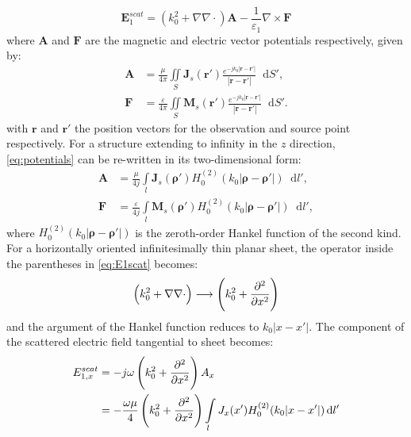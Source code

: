 \documentclass[11pt]{article}
\renewcommand{\v}[1]{\mathbf{#1}} %
\renewcommand{\O}{\omega}  %
\newcommand{\E}{\varepsilon}  %
\renewcommand{\u}{\mu}  %
\newcommand{\p}{\rho}  %
\newcommand{\x}{\times}  %
\renewcommand{\del}{\nabla}  %
\renewcommand{\^}{\hat}  %
\newcommand*\diff{\mathop{}\!\mathrm{d}} %
\begin{document}
%
\begin{equation}
  \v E_1^{scat} = \left( k_0^2 + \del \del \cdot \right) \v A
  - \frac{1}{\E_1} \del \x \v F
  \label{eq:E1scat}
\end{equation}
%
where $\v A$ and $\v F$ are the magnetic and electric vector potentials respectively, given by:
%
\begin{subequations}
  \begin{align}
    \v A &=  \frac{\u}{4 \pi} \iint\limits_{S} \v J_s(\v r') \frac{ e^{-j k_0 |\v r - \v r'|}}{|\v r - \v r'|} \diff{S'},
    \label{eq:A}\\
    \v F &=  \frac{\E}{4 \pi} \iint\limits_{S} \v M_s(\v r') \frac{ e^{-j k_0 |\v r - \v r'|}}{|\v r - \v r'|} \diff{S'}.
    \label{eq:Fig}
  \end{align}
  \label{eq:potentials}
\end{subequations}
%
with $\v r$ and $\v r'$ the position vectors for the observation and source point respectively. For a structure extending to infinity in the $z$ direction, \eqref{eq:potentials} can be re-written in its two-dimensional form:
%
\begin{subequations}
  \begin{align}
    \v A &=  \frac{\u}{4 j} \int\limits_{l} \v J_s(\v \p') H_0^{(2)}(k_0 |\v \p - \v \p'|) \diff{l'},
    \label{eq:A}\\
    \v F &=  \frac{\E}{4 j} \int\limits_{l} \v M_s(\v \p') H_0^{(2)}(k_0 |\v \p - \v \p'|) \diff{l'},
    \label{eq:Fig}
  \end{align}
  \label{eq:potentials_2d}
\end{subequations}
%
where $H_0^{(2)}(k_0 |\v \p - \v \p'|)$ is the zeroth-order Hankel function of the second kind. For a horizontally oriented infinitesimally thin planar sheet, the operator inside the parentheses in \eqref{eq:E1scat} becomes:
%
\begin{equation}
  \left( k_0^2 + \del \del \cdot \right) \longrightarrow \left( k_0^2 + \pdv[2]{}{x} \right)
  \label{eq:operator}
\end{equation}
%
and the argument of the Hankel function reduces to $k_0|x - x'|$. The component of the scattered electric field tangential to sheet becomes:
%
\begin{equation}
  \begin{split}
    E_{1,x}^{scat} &= -j \O \left(k_0^2 +  \pdv[2]{}{x} \right) A_x \\
    &= -\frac{\O \u}{4} \left(k_0^2 +  \pdv[2]{}{x} \right) \int\limits_{l} J_x(x')  H_0^{(2)}(k_0 |x - x'|) \diff{l'}
  \end{split}
  \label{eq:E1sc}
\end{equation}
\end{document}

